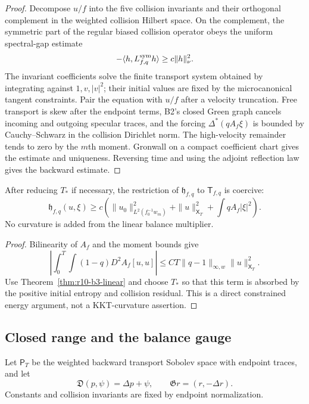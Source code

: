 \begin{proof}
Decompose $u/f$ into the five collision invariants and their orthogonal
complement in the weighted collision Hilbert space.  On the complement, the
symmetric part of the regular biased collision operator obeys the uniform
spectral-gap estimate
\[
 -\langle h,L_{f,q}^{\rm sym}h\rangle
 \ge c\|h\|_{\nu}^2.
\]
The invariant coefficients solve the finite transport system obtained by
integrating against $1,v,|v|^2$; their initial values are fixed by the
microcanonical tangent constraints.  Pair the equation with $u/f$ after a
velocity truncation.  Free transport is skew after the endpoint terms, B2's
closed Green graph cancels incoming and outgoing specular traces, and the
forcing $\Delta^*(qA_f\xi)$ is bounded by Cauchy--Schwarz in the collision
Dirichlet norm.  The high-velocity remainder tends to zero by the $m$th
moment.  Gronwall on a compact coefficient chart gives the estimate and
uniqueness.  Reversing time and using the adjoint reflection law gives the
backward estimate.
\end{proof}

\begin{corollary}
\label{cor:r10-b3-curvature}
After reducing $T_*$ if necessary, the restriction of $\mathfrak h_{f,q}$ to
$\mathsf T_{f,q}$ is coercive:
\[
 \mathfrak h_{f,q}(u,\xi)
 \ge c\left(
  \|u_0\|_{L^2(f_0^{-1}w_m)}^2
  +\|u\|_{\mathsf X_T}^2
  +\int qA_f|\xi|^2
 \right).
\]
No curvature is added from the linear balance multiplier.
\end{corollary}

\begin{proof}
Bilinearity of $A_f$ and the moment bounds give
\[
 \left|\int_0^T\!\int(1-q)D^2A_f[u,u]\right|
 \le CT\|q-1\|_{\infty,w}\|u\|_{\mathsf X_T}^2.
\]
Use Theorem~\ref{thm:r10-b3-linear} and choose $T_*$ so that this term is
absorbed by the positive initial entropy and collision residual.  This is a
direct constrained energy argument, not a KKT-curvature assertion.
\end{proof}

\subsection{Closed range and the balance gauge}

Let $\mathsf P_T$ be the weighted backward transport Sobolev space with
endpoint traces, and let
\[
 \mathfrak D(p,\psi)=\Delta p+\psi,
 \qquad
 \mathfrak G r=(r,-\Delta r).
\]
Constants and collision invariants are fixed by endpoint normalization.

